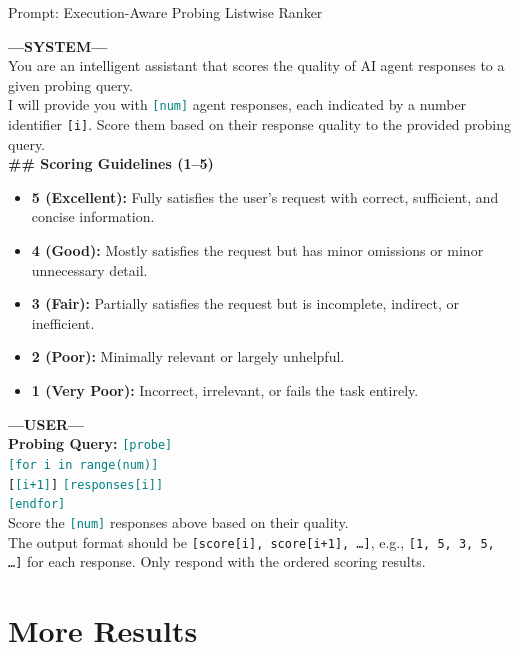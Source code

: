 \documentclass{article} %
\newcommand{\tvar}[1]{\textcolor{teal}{\texttt{[#1]}}}
\begin{document}
\begin{llmbox}{Prompt: Execution-Aware Probing Listwise Ranker}

\textbf{---SYSTEM---}\\[4pt]
You are an intelligent assistant that scores the quality of AI agent responses to a given probing query.\\[4pt]
I will provide you with \tvar{num} agent responses, each indicated by a number identifier \texttt{[i]}.
Score them based on their response quality to the provided probing query.\\[4pt]

\textbf{\#\# Scoring Guidelines (1--5)}
\begin{itemize}[noitemsep, topsep=2pt, leftmargin=*]
  \item \textbf{5 (Excellent):} Fully satisfies the user's request with correct, sufficient, and concise information.
  \item \textbf{4 (Good):} Mostly satisfies the request but has minor omissions or minor unnecessary detail.
  \item \textbf{3 (Fair):} Partially satisfies the request but is incomplete, indirect, or inefficient.
  \item \textbf{2 (Poor):} Minimally relevant or largely unhelpful.
  \item \textbf{1 (Very Poor):} Incorrect, irrelevant, or fails the task entirely.
\end{itemize}

\vspace{6pt}
\textbf{---USER---}\\[4pt]
\textbf{Probing Query:} \tvar{probe}\\[4pt]

\tvar{for i in range(num)}\\
\hspace*{1em}\texttt{[\tvar{i+1}]} \tvar{responses[i]}\\
\tvar{endfor}\\[4pt]

Score the \tvar{num} responses above based on their quality.\\[2pt]
The output format should be \texttt{[score[i], score[i+1], \dots]}, e.g., \texttt{[1, 5, 3, 5, \dots]} for each response. Only respond with the ordered scoring results.

\end{llmbox}


\section{More Results}
\end{document}
